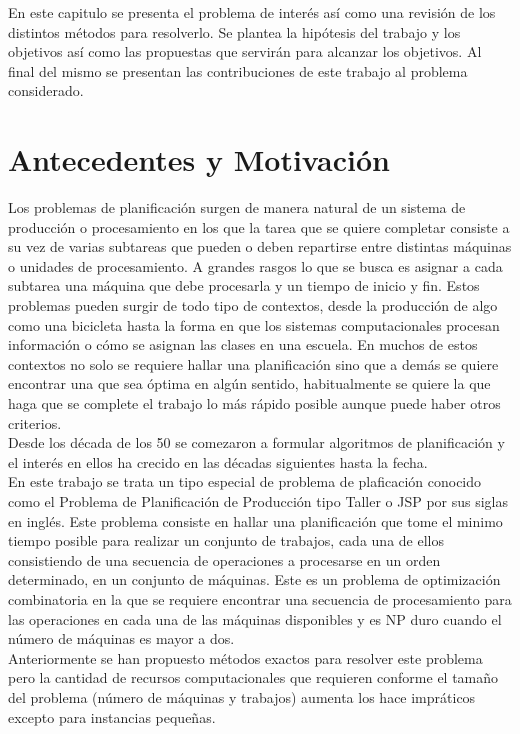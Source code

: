 En este capitulo se presenta el problema de interés así como una revisión de los distintos métodos para resolverlo. Se plantea la hipótesis del trabajo y los objetivos así como las propuestas que servirán para alcanzar los objetivos. Al final del mismo se presentan las contribuciones de este trabajo al problema considerado.
\section{Antecedentes y Motivación}
Los problemas de planificación surgen de manera natural de un sistema de producción o procesamiento en los que la tarea que se quiere completar consiste a su vez de varias subtareas que pueden o deben repartirse entre distintas máquinas o unidades de procesamiento. A grandes rasgos lo que se busca es asignar a cada subtarea una máquina que debe procesarla y un tiempo de inicio y fin.  Estos problemas pueden surgir de todo tipo de contextos, desde la producción de algo como una bicicleta hasta la forma en que los sistemas computacionales procesan información o cómo se asignan las clases en una escuela. En muchos de estos contextos no solo se requiere hallar una planificación sino que a demás se quiere encontrar una que sea óptima en algún sentido, habitualmente se quiere la que haga que se complete el trabajo lo más rápido posible aunque puede haber otros criterios.\\
Desde los década de los 50 se comezaron a formular algoritmos de planificación\cite{johnson1954optimal} y el interés en ellos ha crecido en las décadas siguientes hasta la fecha.\\ 
 
En este trabajo se trata un tipo especial de problema de plaficación conocido como el Problema de Planificación de Producción tipo Taller o JSP por sus siglas en inglés. Este problema consiste en hallar una planificación que tome el minimo tiempo posible para realizar un conjunto de trabajos, cada una de ellos consistiendo de una secuencia de operaciones a procesarse en un orden determinado, en un conjunto de máquinas. Este es un problema de optimización combinatoria en la que se requiere encontrar una secuencia de procesamiento para las operaciones en cada una de las máquinas disponibles y es NP duro cuando el número de máquinas es mayor a dos.\\

Anteriormente se han propuesto métodos exactos para resolver este problema \cite{Brucker1994} pero la cantidad de recursos computacionales que requieren conforme el tamaño del problema (número de máquinas y trabajos) aumenta los hace impráticos excepto para instancias pequeñas.


